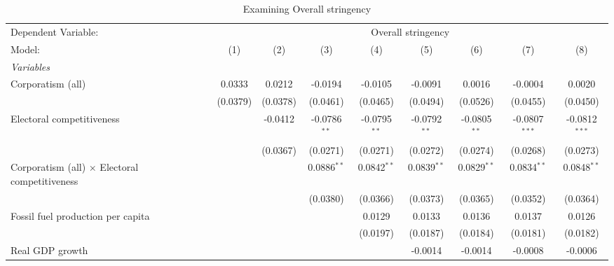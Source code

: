 
\begin{table}[htbp]
   \caption{Examining Overall stringency}
   \centering
   \begin{tabular}{lcccccccc}
      \tabularnewline \midrule \midrule
      Dependent Variable: & \multicolumn{8}{c}{Overall stringency}\\
      Model:                                                & (1)      & (2)      & (3)            & (4)            & (5)            & (6)            & (7)             & (8)\\  
      \midrule
      \emph{Variables}\\
      Corporatism (all)                                     & 0.0333   & 0.0212   & -0.0194        & -0.0105        & -0.0091        & 0.0016         & -0.0004         & 0.0020\\   
                                                            & (0.0379) & (0.0378) & (0.0461)       & (0.0465)       & (0.0494)       & (0.0526)       & (0.0455)        & (0.0450)\\   
      Electoral competitiveness                             &          & -0.0412  & -0.0786$^{**}$ & -0.0795$^{**}$ & -0.0792$^{**}$ & -0.0805$^{**}$ & -0.0807$^{***}$ & -0.0812$^{***}$\\   
                                                            &          & (0.0367) & (0.0271)       & (0.0271)       & (0.0272)       & (0.0274)       & (0.0268)        & (0.0273)\\   
      Corporatism (all) $\times$ Electoral competitiveness  &          &          & 0.0886$^{**}$  & 0.0842$^{**}$  & 0.0839$^{**}$  & 0.0829$^{**}$  & 0.0834$^{**}$   & 0.0848$^{**}$\\   
                                                            &          &          & (0.0380)       & (0.0366)       & (0.0373)       & (0.0365)       & (0.0352)        & (0.0364)\\   
      Fossil fuel production per capita                     &          &          &                & 0.0129         & 0.0133         & 0.0136         & 0.0137          & 0.0126\\   
                                                            &          &          &                & (0.0197)       & (0.0187)       & (0.0184)       & (0.0181)        & (0.0182)\\   
      Real GDP growth                                       &          &          &                &                & -0.0014        & -0.0014        & -0.0008         & -0.0006\\   

\end{tabular}
\end{table}
